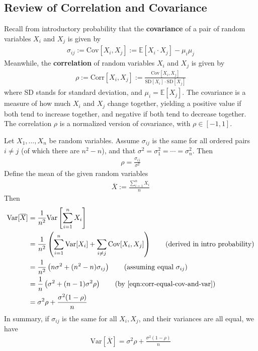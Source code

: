 \documentclass[12pt, a4paper]{article}
\theoremstyle{definition}
\begin{document}
	\subsection*{Review of Correlation and Covariance}
	Recall from introductory probability that the \textbf{covariance}
	of a pair of random variables $X_i$ and $X_j$ is given by
	\begin{align*}
		\sigma_{ij} := \text{Cov}[X_i,X_j] := \mathbb{E}[X_i\cdot X_j] - \mu_i\mu_j
	\end{align*}
	Meanwhile, the \textbf{correlation} of random variables $X_i$ and $X_j$
	is given by
	\begin{align*}
		\rho := \text{Corr}[X_i,X_j] := \frac{\text{Cov}[X_i,X_j]}{\text{SD}[X_i]\cdot \text{SD}[X_j]}
	\end{align*}
	where SD stands for standard deviation, and $\mu_i = \mathbb{E}[X_j]$.
	The covariance is a measure of how much $X_i$ and $X_j$ change together,
	yielding a positive value if both tend to increase together, and negative
	if both tend to decrease together. The correlation $\rho$ is a normalized
	version of covariance, with $\rho\in [-1, 1]$.
	
	Let $X_1,\ldots,X_n$ be random variables. Assume $\sigma_{ij}$ is the same for all
	ordered pairs $i\neq j$ (of which there are $n^2 - n$), and that
	$\sigma^2 = \sigma_1^2 = \cdots = \sigma_n^2$. Then
	\begin{align}
		\rho = \frac{\sigma_{ij}}{\sigma^2}
		\label{eqn:corr-equal-cov-and-var}
	\end{align}
	Define the mean of the given random variables
	\begin{align*}
		\overline{X} := \frac{\sum_{i=1}^{n}X_i}{n}
	\end{align*}
	Then
	\begin{align*}
		\text{Var}[\overline{X}]
		&= \frac{1}{n^2}\text{Var}\left[\sum_{i=1}^{n}X_i\right]\\
		&= \frac{1}{n^2}\left(
		\sum_{i=1}^{n}\text{Var}[X_i] + \sum_{i\neq j}\text{Cov}[X_i,X_j]
		\right)\tag{derived in intro probability}\\
		&= \frac{1}{n^2}\left(
		n\sigma^2 + (n^2-n)\sigma_{ij}
		\right)\tag{assuming equal $\sigma_{ij}$}\\
		&= \frac{1}{n}\left(
		\sigma^2 + (n - 1)\sigma^2 \rho
		\right)
		\tag{by \ref{eqn:corr-equal-cov-and-var}}\\
		&=\sigma^2\rho + \frac{\sigma^2(1-\rho)}{n}
	\end{align*}
	In summary, if $\sigma_{ij}$ is the same for all $X_i, X_j$,
	and their variances are all equal, we have
	\begin{align}
		\text{Var}[\overline{X}] = \sigma^2\rho + \frac{\sigma^2 (1-\rho)}{n}
		\label{eqn:variance-Xbar}
	\end{align}
\end{document}
